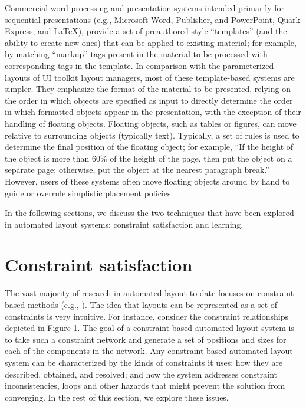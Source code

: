     Commercial word-processing and presentation systems intended primarily for sequential presentations (e.g., Microsoft Word, Publisher, and PowerPoint, Quark Express, and LaTeX), provide a set of preauthored style “templates” (and the ability to create new ones) that can be applied to existing material; for example, by matching “markup” tags present in the material to be processed with corresponding tags in the template. In comparison with the parameterized layouts of UI toolkit layout managers, most of these template-based systems are simpler. They emphasize the format of the material to be presented, relying on the order in which objects are specified as input to directly determine the order in which formatted objects appear in the presentation, with the exception of their handling of floating objects. Floating objects, such as tables or figures, can move relative to surrounding objects (typically text). Typically, a set of rules is used to determine the final position of the floating object; for example, “If the height of the object is more than 60\% of the height of the page, then put the object on a separate page; otherwise, put the object at the nearest paragraph break.” However, users of these systems often move floating objects around by hand to guide or overrule simplistic placement policies.

    In the following sections, we discuss the two techniques that have been explored in automated layout systems: constraint satisfaction and learning.

    \section{Constraint satisfaction}
    \label{constraint-satisfaction}

    The vast majority of research in automated layout to date focuses on constraint-based methods (e.g., \citep{vanderzanden-1,borning-1,graf-1,hudson-3,kochhar-1,hudson-2,weitzman-2,myers-2}). The idea that layouts can be represented as a set of constraints is very intuitive. For instance, consider the constraint relationships depicted in Figure 1. The goal of a constraint-based automated layout system is to take such a constraint network and generate a set of positions and sizes for each of the components in the network. Any constraint-based automated layout system can be characterized by the kinds of constraints it uses; how they are described, obtained, and resolved; and how the system addresses constraint inconsistencies, loops and other hazards that might prevent the solution from converging. In the rest of this section, we explore these issues.

